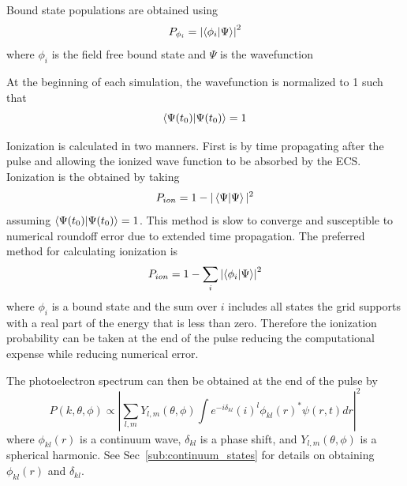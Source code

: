 Bound state populations are obtained using 
\begin{equation}
  P_{\phi_i} = \left|\bra{\phi_i}\ket{\Psi}\right|^2
\end{equation}
where $\phi_i$ is the field free bound state and $\Psi$ is the wavefunction

At the beginning of each simulation, the wavefunction is normalized to 1 such that
\begin{equation}
\bra{\Psi(t_0)}\ket{\Psi(t_0)} = 1
\end{equation}

Ionization is calculated in two manners. First is by time propagating after the pulse and allowing the ionized wave function to be absorbed by the ECS. Ionization is the obtained by taking 
\begin{equation}
  P_{ion}=1-|\bra{\Psi}\ket{\Psi}|^2
\end{equation}
assuming $\bra{\Psi(t_0)}\ket{\Psi(t_0)}=1$. This method is slow to converge and susceptible to numerical roundoff error due to extended time propagation. The preferred method for calculating ionization is 
\begin{equation}
  P_{ion}=1-\sum\limits_i\left|\bra{\phi_i}\ket{\Psi}\right|^2
\end{equation}
where $\phi_i$ is a bound state and the sum over $i$ includes all states the grid supports with a real part of the energy that is less than zero. Therefore the ionization probability can be taken at the end of the pulse reducing the computational expense while reducing numerical error.


The photoelectron spectrum can then be obtained at the end of the pulse by 
\begin{equation}
    P(k,\theta,\phi) \propto \left|\sum_{l,m} Y_{l,m}(\theta,\phi)\int  e^{-i\delta_{kl}}(i)^l \phi_{kl}(r)^* \psi(r,t) dr \right|^2
\end{equation}
where $\phi_{kl}(r)$ is a continuum wave, $\delta_{kl}$ is a phase shift, and $Y_{l,m}(\theta,\phi)$ is a spherical harmonic. See Sec~\ref{sub:continuum_states} for details on obtaining $\phi_{kl}(r)$ and $\delta_{kl}$.


